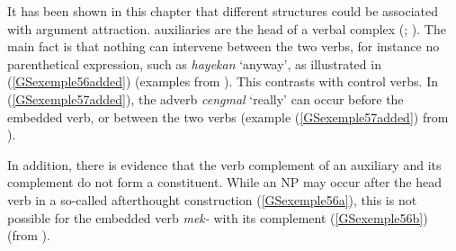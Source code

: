 It has been shown in this chapter that different structures could be associated with argument attraction.  auxiliaries are the head of a verbal complex (\citealt{Chung98a-u}; \citealt{Kim2016a-u}). The main fact is that nothing can intervene between the two verbs, for instance no parenthetical expression, such as \emph{hayekan} `anyway', as illustrated in (\ref{GSexemple56added}) (examples from \citealt[162]{Chung98a-u}). This contrasts with control verbs. In (\ref{GSexemple57added}), the adverb \emph{cengmal} `really' can occur before the embedded verb, or between the two verbs (example (\ref{GSexemple57added}) from \citealt[93]{Kim2016a-u}).


\eal
	\label{GSexemple56added} 
	\label{GSexemple56added-a}

	\label{GSexemple56added-b}
\zl

\z

In addition, there is evidence that the verb complement of an auxiliary and its complement do not form a constituent. While an NP may occur after the head verb in a so-called afterthought construction (\ref{GSexemple56a}), this is not possible for the embedded verb \emph{mek-} with its complement (\ref{GSexemple56b}) (from \citealt[162]{Chung98a-u}).


